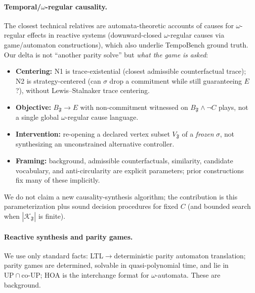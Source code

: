 \documentclass[11pt]{article}
\theoremstyle{remark}
\newcommand{\Frame}{\mathfrak{F}}
\begin{document}
\paragraph{Temporal/\(\omega\)-regular causality.} The closest technical
relatives are automata-theoretic accounts of causes for \(\omega\)-regular
effects in reactive systems (downward-closed \(\omega\)-regular causes via
game/automaton constructions), which also underlie TempoBench ground truth. Our
delta is not ``another parity solve'' but \emph{what the game is asked}:
\begin{itemize}[nosep]
  \item \textbf{Centering:} N1 is trace-existential (closest admissible
        counterfactual trace); N2 is strategy-centered (can \(\sigma\) drop a
        commitment while still guaranteeing \(E\)?), without Lewis--Stalnaker
        trace centering.
  \item \textbf{Objective:} \(B_{\Frame}\rightarrow E\) with non-commitment
        witnessed on \(B_{\Frame}\wedge\neg C\) plays, not a single global
        \(\omega\)-regular cause language.
  \item \textbf{Intervention:} re-opening a declared vertex subset
        \(V_{\Frame}\) of a \emph{frozen} \(\sigma\), not synthesizing an
        unconstrained alternative controller.
  \item \textbf{Framing:} background, admissible counterfactuals, similarity,
        candidate vocabulary, and anti-circularity are explicit parameters; prior
        constructions fix many of these implicitly.
\end{itemize}
We do not claim a new causality-synthesis algorithm; the contribution is this
parameterization plus sound decision procedures for fixed \(C\) (and bounded
search when \(|\mathcal{K}_{\Frame}|\) is finite).

\paragraph{Reactive synthesis and parity games.} We use only standard facts:
LTL\(\to\)deterministic parity automaton translation; parity games are determined,
solvable in quasi-polynomial time, and lie in \(\mathrm{UP}\cap\mathrm{co\text{-}UP}\);
HOA is the interchange format for \(\omega\)-automata. These are background.
\end{document}
